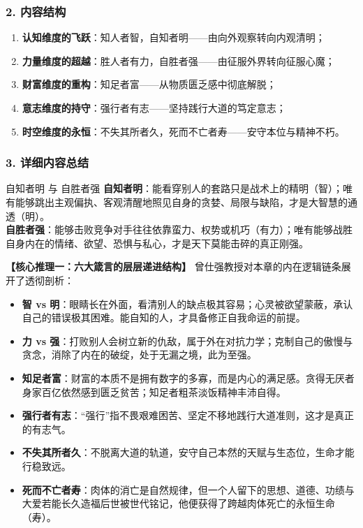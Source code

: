 \subsubsection{2. 内容结构}
\begin{enumerate}
    \item \textbf{认知维度的飞跃}：知人者智，自知者明——由向外观察转向内观清明；
    \item \textbf{力量维度的超越}：胜人者有力，自胜者强——由征服外界转向征服心魔；
    \item \textbf{财富维度的重构}：知足者富——从物质匮乏感中彻底解脱；
    \item \textbf{意志维度的持守}：强行者有志——坚持践行大道的笃定意志；
    \item \textbf{时空维度的永恒}：不失其所者久，死而不亡者寿——安守本位与精神不朽。
\end{enumerate}

\subsubsection{3. 详细内容总结}

\begin{ConceptBox}{自知者明 与 自胜者强}
\textbf{自知者明}：能看穿别人的套路只是战术上的精明（智）；唯有能够跳出主观偏执、客观清醒地照见自身的贪婪、局限与缺陷，才是大智慧的通透（明）。\\
\textbf{自胜者强}：能够击败竞争对手往往依靠蛮力、权势或机巧（有力）；唯有能够战胜自身内在的情绪、欲望、恐惧与私心，才是天下莫能击碎的真正刚强。
\end{ConceptBox}

\noindent\textbf{【核心推理一：六大箴言的层层递进结构】}
曾仕强教授对本章的内在逻辑链条展开了透彻剖析：
\begin{itemize}
    \item \textbf{智 vs 明}：眼睛长在外面，看清别人的缺点极其容易；心灵被欲望蒙蔽，承认自己的错误极其困难。能自知的人，才具备修正自我命运的前提。
    \item \textbf{力 vs 强}：打败别人会树立新的仇敌，属于外在对抗力学；克制自己的傲慢与贪念，消除了内在的破绽，处于无漏之境，此为至强。
    \item \textbf{知足者富}：财富的本质不是拥有数字的多寡，而是内心的满足感。贪得无厌者身家百亿依然感到匮乏贫苦；知足者粗茶淡饭精神丰沛自得。
    \item \textbf{强行者有志}：“强行”指不畏艰难困苦、坚定不移地践行大道准则，这才是真正的有志气。
    \item \textbf{不失其所者久}：不脱离大道的轨道，安守自己本然的天赋与生态位，生命才能行稳致远。
    \item \textbf{死而不亡者寿}：肉体的消亡是自然规律，但一个人留下的思想、道德、功绩与大爱若能长久造福后世被世代铭记，他便获得了跨越肉体死亡的永恒生命（寿）。
\end{itemize}

